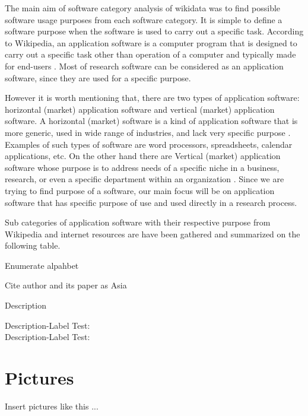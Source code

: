 The main aim of software category analysis of wikidata was to find possible software usage purposes from each software category. It is simple to define a software purpose when the software is used to carry out a specific task. 
According to Wikipedia, an application software is a  computer program that is designed to carry out a specific task other than operation of a computer and typically made for end-users \citep{enwiki:1060918552}. Most of research software can be considered as an application software, since they are used for a specific purpose. 

However it is worth mentioning that, there are two types of application software: horizontal (market) application software and vertical (market) application software. A horizontal (market) software is a kind of application software that is more generic, used in wide range of industries, and lack very specific purpose \citep{enwiki:1034388659}.  Examples of such types of software are word processors, spreadsheets, calendar applications, etc. On the other hand there are Vertical (market) application software whose purpose is to address needs of a specific niche in a business, research, or even a specific department within an organization \citep{enwiki:879502666}. Since we are trying to find purpose of a software, our main focus will be on application software that has specific purpose of use and used directly in a research process.  

Sub categories of application software with their respective purpose from Wikipedia and internet resources are have been gathered and summarized on the following table. 


Enumerate alpahbet

\begin{aenumerate}
	\item
	\item

\end{aenumerate}

Cite author and its paper as  Asia \citeauthor{bentley:1999} \citep{bentley:1999} 

Description

\begin{description}
  \item[Description-Label Test:] 
  \item[Description-Label Test:] 
\end{description}

%
%
\section{Pictures}
\label{sec:chapter03:Pictures}
Insert pictures like this ...

